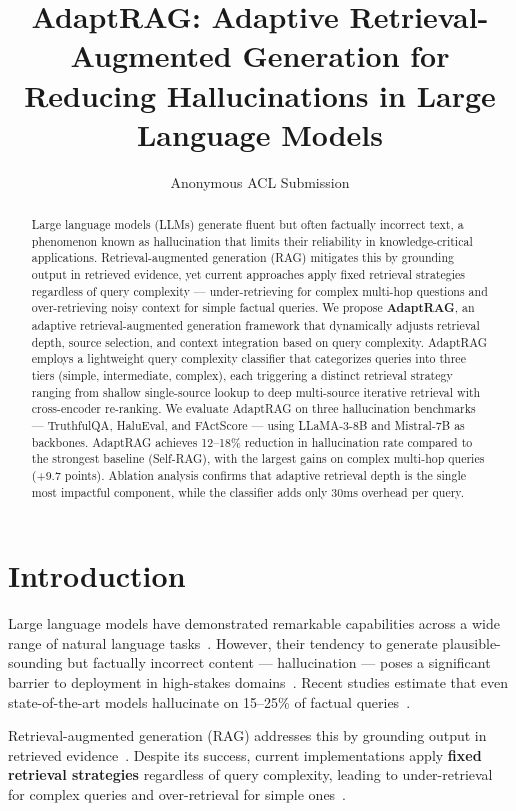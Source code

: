 \documentclass[11pt]{article}
\title{AdaptRAG: Adaptive Retrieval-Augmented Generation for\\Reducing Hallucinations in Large Language Models}
\author{Anonymous ACL Submission}
\date{}
\begin{document}
\maketitle

\begin{abstract}
Large language models (LLMs) generate fluent but often factually incorrect text, a phenomenon known as hallucination that limits their reliability in knowledge-critical applications. Retrieval-augmented generation (RAG) mitigates this by grounding output in retrieved evidence, yet current approaches apply fixed retrieval strategies regardless of query complexity --- under-retrieving for complex multi-hop questions and over-retrieving noisy context for simple factual queries. We propose \textbf{AdaptRAG}, an adaptive retrieval-augmented generation framework that dynamically adjusts retrieval depth, source selection, and context integration based on query complexity. AdaptRAG employs a lightweight query complexity classifier that categorizes queries into three tiers (simple, intermediate, complex), each triggering a distinct retrieval strategy ranging from shallow single-source lookup to deep multi-source iterative retrieval with cross-encoder re-ranking. We evaluate AdaptRAG on three hallucination benchmarks --- TruthfulQA, HaluEval, and FActScore --- using LLaMA-3-8B and Mistral-7B as backbones. AdaptRAG achieves 12--18\% reduction in hallucination rate compared to the strongest baseline (Self-RAG), with the largest gains on complex multi-hop queries (+9.7 points). Ablation analysis confirms that adaptive retrieval depth is the single most impactful component, while the classifier adds only 30ms overhead per query.
\end{abstract}

\section{Introduction}

Large language models have demonstrated remarkable capabilities across a wide range of natural language tasks~\citep{Brown2020GPT3,Touvron2023LLaMA}. However, their tendency to generate plausible-sounding but factually incorrect content --- hallucination --- poses a significant barrier to deployment in high-stakes domains~\citep{Huang2023HallucinationSurvey}. Recent studies estimate that even state-of-the-art models hallucinate on 15--25\% of factual queries~\citep{Mallen2023Popularity,Min2023FActScore}.

Retrieval-augmented generation (RAG) addresses this by grounding output in retrieved evidence~\citep{Lewis2020RAG}. Despite its success, current implementations apply \textbf{fixed retrieval strategies} regardless of query complexity, leading to under-retrieval for complex queries and over-retrieval for simple ones~\citep{Yoran2024Robust}.
\end{document}
